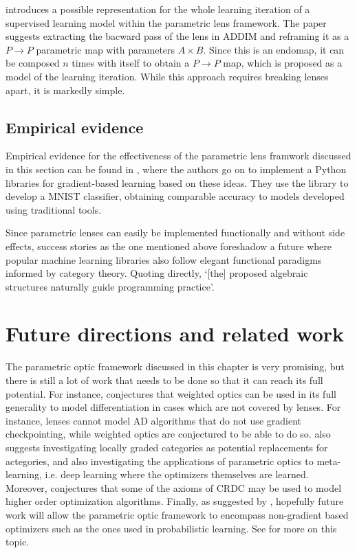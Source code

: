 \documentclass[11pt,a4paper,openright,twoside]{report}
\theoremstyle{plain}
\theoremstyle{definition}
\begin{document}
\cite{cruttwell2022categorical} introduces a possible representation for the whole learning iteration of a supervised learning model within the parametric lens framework. The paper suggests extracting the bacward pass of the lens in ADDIM and reframing it as a $P \to P$ parametric map with parameters $A \times B$. Since this is an endomap, it can be composed $n$ times with itself to obtain a $P \to P$ map, which is proposed as a model of the learning iteration. While this approach requires breaking lenses apart, it is markedly simple.


\subsection{Empirical evidence}

Empirical evidence for the effectiveness of the parametric lens framwork discussed in this section can be found in \cite{cruttwell2022categorical}, where the authors go on to implement a Python libraries for gradient-based learning based on these ideas. They use the library to develop a MNIST classifier, obtaining comparable accuracy to models developed using traditional tools.


Since parametric lenses can easily be implemented functionally and without side effects, success stories as the one mentioned above foreshadow a future where popular machine learning libraries also follow elegant functional paradigms informed by category theory. Quoting  \cite{cruttwell2022categorical} directly, \lq[the] proposed algebraic structures naturally guide programming practice\rq.


\section{Future directions and related work}

The parametric optic framework discussed in this chapter is very promising, but there is still a lot of work that needs to be done so that it can reach its full potential. For instance, \cite{gavranovic2024fundamental} conjectures that weighted optics can be used in its full generality to model differentiation in cases which are not covered by lenses. For instance, lenses cannot model AD algorithms that do not use gradient checkpointing, while weighted optics are conjectured to be able to do so. \cite{gavranovic2024fundamental} also suggests investigating locally graded categories as potential replacements for actegories, and also investigating the applications of parametric optics to meta-learning, i.e. deep learning where the optimizers themselves are learned. Moreover, \cite{cruttwell2022categorical} conjectures that some of the axioms of CRDC may be used to model higher order optimization algorithms. Finally, as suggested by \cite{cruttwell2022categorical}, hopefully future work will allow the parametric optic framework to encompass non-gradient based optimizers such as the ones used in probabilistic learning. See \cite{shiebler2021category} for more on this topic.
\end{document}
